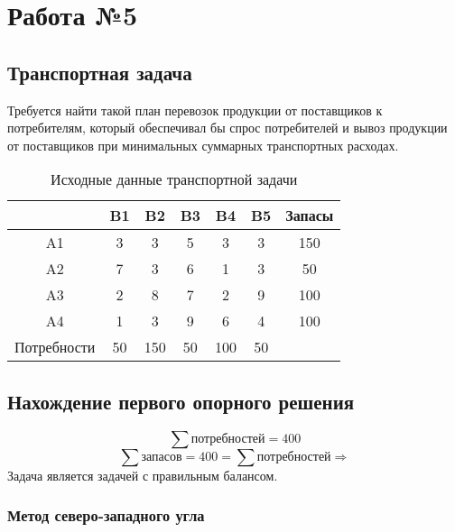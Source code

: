 \documentclass[17pt]{extarticle}
\begin{document}
\section*{Работа №5}
\subsection*{Транспортная задача}

Требуется найти такой план перевозок продукции от поставщиков к потребителям, который обеспечивал бы спрос потребителей и вывоз продукции от поставщиков при минимальных суммарных транспортных расходах.

\begin{table}[h!]
    \centering
    \begin{tabular}{c|ccccc|c}
        \toprule
                    & B1 & B2  & B3 & B4  & B5 & Запасы \\
        \midrule
        A1          & 3  & 3   & 5  & 3   & 3  & 150    \\
        A2          & 7  & 3   & 6  & 1   & 3  & 50     \\
        A3          & 2  & 8   & 7  & 2   & 9  & 100    \\
        A4          & 1  & 3   & 9  & 6   & 4  & 100    \\
        \midrule
        Потребности & 50 & 150 & 50 & 100 & 50 &        \\
        \bottomrule
    \end{tabular}
    \caption{Исходные данные транспортной задачи}
\end{table}

\subsection*{Нахождение первого опорного решения}

\[
    \sum \text{потребностей} = 400
\]
\[
    \sum \text{запасов} = 400 = \sum \text{потребностей} \Rightarrow
\]
Задача является задачей с правильным балансом.

\subsubsection*{Метод северо-западного угла}
\end{document}
